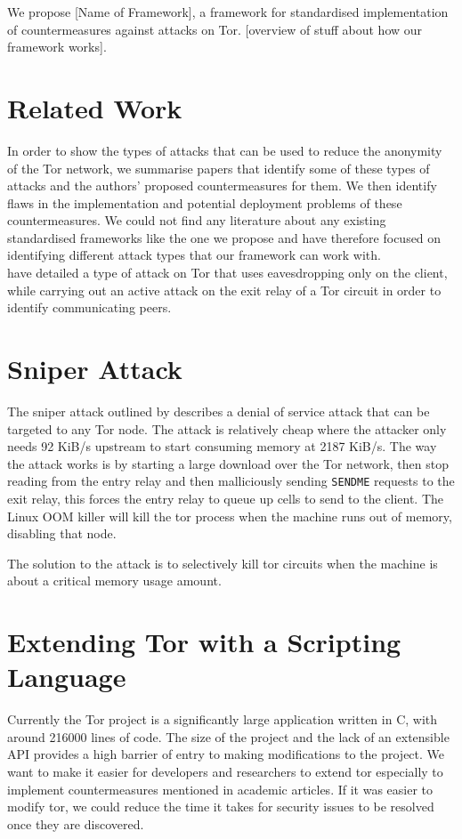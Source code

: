 \documentclass[9pt,technote]{IEEEtran}
\begin{document}
We propose [Name of Framework], a framework for standardised implementation of countermeasures against attacks on Tor. [overview of stuff about how our framework works].

\cite{hayesguard}\cite{gilad2012spying}\cite{sun2015raptor}\cite{biryukov2012torscan}\cite{jansen2014sniper}\cite{tor}

\section{Related Work} In order to show the types of attacks that can be used to
reduce the anonymity of the Tor network, we summarise papers that identify some
of these types of attacks and the authors' proposed countermeasures for them. We
then identify flaws in the implementation and potential deployment problems of
these countermeasures. We could not find any literature about any existing
standardised frameworks like the one we propose and have therefore focused on
identifying different attack types that our framework can work with.\\

\citeauthor{gilad2012spying} have detailed a type of attack on Tor that uses
eavesdropping only on the client, while carrying out an active attack on the
exit relay of a Tor circuit in order to identify communicating peers.

\section{Sniper Attack}
The sniper attack outlined by \citeauthor{jansen2014sniper} describes a denial
of service attack that can be targeted to any Tor node. The attack is relatively
cheap where the attacker only needs 92 KiB/s upstream to start consuming memory
at 2187 KiB/s. The way the attack works is by starting a large download over the
Tor network, then stop reading from the entry relay and then malliciously
sending \texttt{SENDME} requests to the exit relay, this forces the entry relay
to queue up cells to send to the client. The Linux OOM killer will kill the tor
process when the machine runs out of memory, disabling that node.

The solution to the attack is to selectively kill tor circuits when the machine
is about a critical memory usage amount.

\section{Extending Tor with a Scripting Language}
Currently the Tor project is a significantly large application written in C,
with around 216000 lines of code. The size of the project and the lack of an
extensible API provides a high barrier of entry to making modifications to the
project. We want to make it easier for developers and researchers to extend tor
especially to implement countermeasures mentioned in academic articles. If it
was easier to modify tor, we could reduce the time it takes for security issues
to be resolved once they are discovered.
\end{document}

